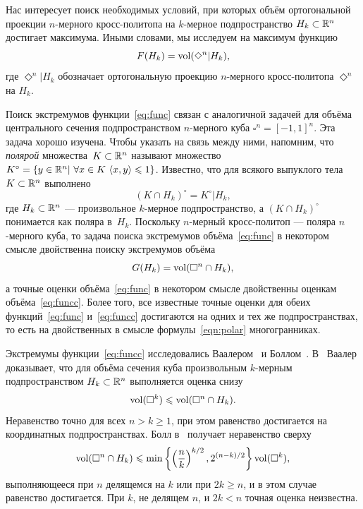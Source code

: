 \documentclass[a4paper,12pt]{article}
\def\vol{\mathop{\rm vol}}
\newcommand{\cube}{\square}
\newcommand{\crosp}{\Diamond}
\numberwithin{equation}{section}
\begin{document}
	Нас интересует поиск необходимых условий, при которых объём ортогональной проекции $n$-мерного кросс-политопа на $k$-мерное подпространство $H_k\subset\mathbb {R}^n$ достигает максимума. Иными словами, мы исследуем на максимум функцию
		\begin{equation}\label{eq:func}
			F(H_k)=\vol(\crosp^n|H_k),
		\end{equation}
	где $\crosp^n|H_k$ обозначает ортогональную проекцию $n$-мерного кросс-политопа $\crosp^n$ на $H_k$.

	Поиск экстремумов функции~\eqref{eq:func} связан с аналогичной задачей для объёма центрального сечения подпространством $n$-мерного куба $\cube^n=[-1,1]^n$. Эта задача хорошо изучена. Чтобы указать на связь между ними, напомним, что \textit{полярой} множества~$K\subset\mathbb {R}^n$ называют множество $K^{\circ}=\{y\in\mathbb {R}^n|\ \forall x\in K\ \langle x,y\rangle\leqslant 1\}$. Известно, что для всякого выпуклого тела $K\subset\mathbb {R}^n$ выполнено
		\begin{equation}\label{eqn:polar}
			(K\cap H_k)^{\circ}=K^{\circ}|H_k,
		\end{equation}
	где $H_k\subset\mathbb {R}^n$ --- произвольное $k$-мерное подпространство, а $(K\cap H_k)^{\circ}$ понимается как поляра в~$H_k$. Поскольку $n$-мерный кросс-политоп --- поляра $n$-мерного куба, то задача поиска экстремумов объёма~\eqref{eq:func} в некотором смысле двойственна поиску экстремумов объёма
		\begin{equation}\label{eq:funcc}
			G(H_k)=\vol(\cube^n\cap H_k),
		\end{equation}
	а точные оценки объёма~\eqref{eq:func} в некотором смысле двойственны оценкам объёма~\eqref{eq:funcc}. Более того, все известные точные оценки для обеих функций~\eqref{eq:func} и~\eqref{eq:funcc} достигаются на одних и тех же подпространствах, то есть на двойственных в смысле формулы~\eqref{eqn:polar} многогранниках.

	Экстремумы функции~\eqref{eq:funcc} исследовались Ваалером~\cite{vaaler} и Боллом~\cite{ballvolumes}. В~\cite{vaaler} Ваалер доказывает, что для объёма сечения куба произвольным $k$-мерным подпространством $H_k\subset\mathbb {R}^n$ выполняется оценка снизу
		\begin{equation}\label{eq:vaaler}
			\vol(\cube^k)\leqslant\vol(\cube^n\cap H_k).
		\end{equation}
	Неравенство точно для всех $n>k\geqslant 1$, при этом равенство достигается на координатных подпространствах. Болл в~\cite{ballvolumes} получает неравенство сверху
		\begin{equation}\label{eq:secup}
			\vol(\cube^n\cap H_k)\leqslant\min\left\{\left(\frac{n}{k}\right)^{k/2}, 2^{(n-k)/2}\right\}\vol(\cube^k),
		\end{equation}
	выполняющееся при $n$ делящемся на $k$ или при $2k\geqslant n$, и в этом случае равенство достигается. При $k$, не делящем $n$, и $2k<n$ точная оценка неизвестна.
\end{document}
